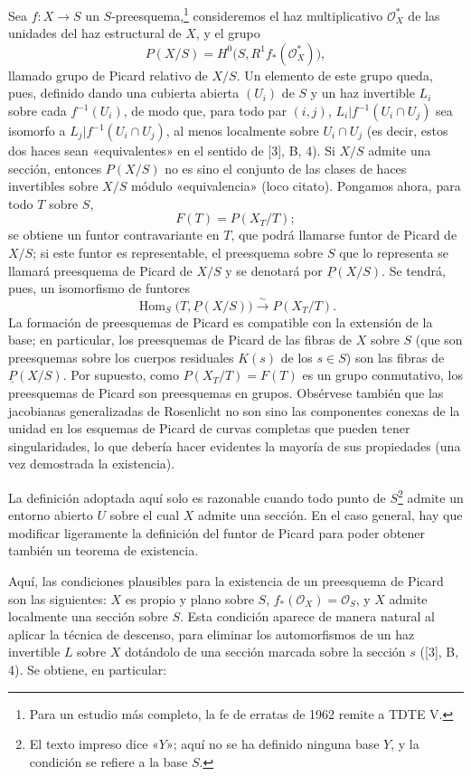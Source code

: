 Sea $f:X\longrightarrow S$ un $S$-preesquema,\footnote{Para un estudio más
completo, la fe de erratas de 1962 remite a TDTE V.} consideremos el haz
multiplicativo $\mathcal O_X^*$ de las unidades del haz estructural de $X$, y
el grupo
\[
  P(X/S)=H^0\bigl(S,R^1f_*(\mathcal O_X^*)\bigr),
\]
llamado grupo de Picard relativo de $X/S$. Un elemento de este grupo queda,
pues, definido dando una cubierta abierta $(U_i)$ de $S$ y un haz invertible
$L_i$ sobre cada $f^{-1}(U_i)$, de modo que, para todo par $(i,j)$,
$L_i|f^{-1}(U_i\cap U_j)$ sea isomorfo a $L_j|f^{-1}(U_i\cap U_j)$, al menos
localmente sobre $U_i\cap U_j$ (es decir, estos dos haces sean «equivalentes»
en el sentido de [3], B, 4). Si $X/S$ admite una sección, entonces $P(X/S)$ no
es sino el conjunto de las clases de haces invertibles sobre $X/S$ módulo
«equivalencia» (loco citato). Pongamos ahora, para todo $T$ sobre $S$,
\[
  F(T)=P(X_T/T) ;
\]
se obtiene un funtor contravariante en $T$, que podrá llamarse funtor de Picard de
$X/S$; si este funtor es representable, el preesquema sobre $S$ que lo
representa se llamará preesquema de Picard de $X/S$ y se denotará por
$\underline P(X/S)$. Se tendrá, pues, un isomorfismo de funtores
\[
  \operatorname{Hom}_S\bigl(T,\underline P(X/S)\bigr)
  \xrightarrow{\sim}P(X_T/T).
\]
La formación de preesquemas de Picard es compatible con la extensión de la
base; en particular, los preesquemas de Picard de las fibras de $X$ sobre $S$
(que son preesquemas sobre los cuerpos residuales $K(s)$ de los $s\in S$) son
las fibras de $\underline P(X/S)$. Por supuesto, como $P(X_T/T)=F(T)$ es un
grupo conmutativo, los preesquemas de Picard son preesquemas en grupos.
Obsérvese también que las jacobianas generalizadas de Rosenlicht no son sino
las componentes conexas de la unidad en los esquemas de Picard de curvas
completas que pueden tener singularidades, lo que debería hacer evidentes la
mayoría de sus propiedades (una vez demostrada la existencia).

 La definición adoptada aquí solo es razonable cuando
todo punto de $S$\footnote{El texto impreso dice «$Y$»; aquí no se ha definido
ninguna base $Y$, y la condición se refiere a la base $S$.} admite un entorno
abierto $U$ sobre el cual $X$ admite una sección. En el caso general, hay que
modificar ligeramente la definición del funtor de Picard para poder obtener
también un teorema de existencia.

Aquí, las condiciones plausibles para la existencia de un preesquema de Picard
son las siguientes: $X$ es propio y plano sobre $S$,
$f_*(\mathcal O_X)=\mathcal O_S$, y $X$ admite localmente una sección sobre
$S$. Esta condición aparece de manera natural al aplicar la técnica de
descenso, para eliminar los automorfismos de un haz invertible $L$ sobre $X$
dotándolo de una sección marcada sobre la sección $s$ ([3], B, 4). Se obtiene,
en particular:

